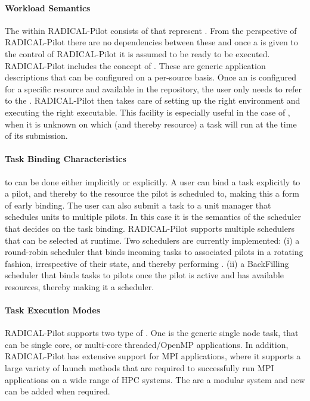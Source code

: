 \documentclass{sig-alternate}
\begin{document}
\paragraph{Workload Semantics}

The  within RADICAL-Pilot consists of 
that represent . From the perspective of RADICAL-Pilot there are
no dependencies between these  and once a
 is given to the control of RADICAL-Pilot it is assumed to
be ready to be executed. RADICAL-Pilot includes the concept of . These are generic application descriptions that can be
configured on a per-source basis. Once an  is
configured for a specific resource and available in the repository, the user
only needs to refer to the . RADICAL-Pilot then
takes care of setting up the right environment and executing the right
executable. This facility is especially useful in the case of
, when it is unknown on which \pilot (and thereby resource)
a task will run at the time of its submission.

\paragraph{Task Binding Characteristics}

 to   can be done either implicitly
or explicitly. A user can bind a task explicitly to a pilot, and thereby to the
resource the pilot is scheduled to, making this a form of early binding. The
user can also submit a task to a unit manager that schedules units to multiple
pilots. In this case it is the semantics of the scheduler that decides on the
task binding. RADICAL-Pilot supports multiple schedulers that can be selected
at runtime. Two schedulers are currently implemented: (i) a round-robin
scheduler that binds incoming tasks to associated pilots in a rotating fashion,
irrespective of their state, and thereby performing . (ii)
a BackFilling scheduler that binds tasks to pilots once the pilot is active and
has available resources, thereby making it a  scheduler.

\paragraph{Task Execution Modes}

RADICAL-Pilot supports two type of . One is the generic single
node task, that can be single core, or multi-core threaded/OpenMP applications.
In addition, RADICAL-Pilot has extensive support for MPI applications, where it
supports a large variety of launch methods that are required to successfully
run MPI applications on a wide range of HPC systems. The  are a modular system and new  can be added
when required.
\end{document}
